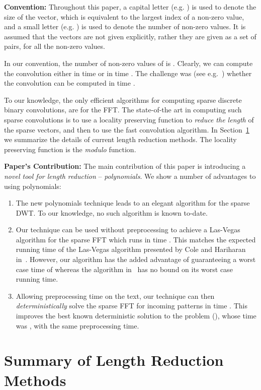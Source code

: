 \documentclass[11pt,amssymb]{article}
\begin{document}
{\bf Convention:} Throughout this paper, a capital letter (e.g. )
is used to denote the size of the vector, which is equivalent to the
largest index of a non-zero value, and a small letter (e.g. ) is
used  to denote the number of non-zero values. It is assumed that the
vectors are not given explicitly, rather they are given as a set of
 pairs, for all the non-zero values.

In our convention, the number of non-zero values of  is . Clearly, we can compute the convolution either in time  or in time . The challenge was (see e.g.~\cite{muthu-open})
whether the convolution can be computed in time .

To our knowledge, the only efficient algorithms for computing sparse
discrete binary convolutions, are for the FFT. The state-of-the art in
computing such sparse convolutions is to use a locality preserving
function to {\em reduce the length} of the sparse vectors, and then
to use the fast convolution algorithm. In Section~\ref{s:pre} we 
summarize the details of current length reduction methods. The
locality preserving function is the {\sl modulo} function.

{\bf Paper's Contribution:} The main contribution of this paper is
introducing a {\em novel tool for length reduction} -- {\sl
  polynomials}.
We show a number of advantages to using polynomials:
\begin{enumerate}
\item The new polynomials technique leads to an elegant algorithm for
  the sparse DWT. To our knowledge, no such algorithm is known to-date.
\item Our technique can be used without preprocessing to achieve a
  Las-Vegas algorithm for the sparse FFT which runs in time . This matches the expected running time of the Las-Vegas
  algorithm presented by Cole and Hariharan in~\cite{CH:02}. However,
  our algorithm has the added advantage of guaranteeing a worst case
  time of  whereas the algorithm in~\cite{CH:02} has no
  bound on its worst case running time.
\item Allowing  preprocessing time on the text, our technique
  can then {\em deterministically} solve the sparse FFT for incoming
  patterns in time . This improves the best known
  deterministic solution to the problem (\cite{LR07}), whose time was
  , with the same preprocessing time.
\end{enumerate}

 \section{Summary of Length Reduction Methods}\label{s:pre}
\end{document}
